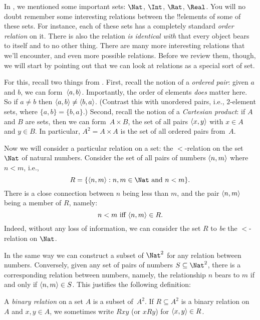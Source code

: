 \documentclass[../../../include/open-logic-section]{subfiles}
\begin{document}

\begin{explain}
In , we mentioned some important sets:
$\Nat$, $\Int$, $\Rat$, $\Real$. You will no doubt remember some
interesting relations between the !!{element}s of some of these sets.
For instance, each of these sets has a completely standard \emph{order
relation} on it.  There is also the relation \emph{is identical with}
that every object bears to itself and to no other thing. There are
many more interesting relations that we'll encounter, and even more
possible relations. Before we review them, though, we will start by
pointing out that we can look at relations as a special sort of set. 
  
For this, recall two things from . First,
recall the notion of a \emph{ordered pair}: given $a$ and $b$, we can
form~$\langle a, b \rangle$. Importantly, the order of elements \emph{does}
matter here. So if $a \neq b$ then $\langle a, b \rangle \neq \langle b, a \rangle$.
(Contrast this with unordered pairs, i.e., $2$-element sets, where
$\{a, b\}=\{b, a\}$.) Second, recall the notion of a \emph{Cartesian
product}: if $A$ and $B$ are sets, then we can form~$A \times B$, the
set of all pairs $\langle x, y \rangle$ with $x \in A$ and $y \in B$. In
particular, $A^{2}= A \times A$ is the set of all ordered pairs
from~$A$.
  
Now we will consider a particular relation on a set: the $<$-relation
on the set~$\Nat$ of natural numbers. Consider the set of all pairs of
numbers $\langle n, m \rangle$ where $n<m$, i.e.,
\[
  R=\Setabs{\tuple{n, m}}{n, m \in \Nat \text{ and } n<m}.
\]
There is a close connection between $n$ being less than $m$, and the
pair $\langle n, m \rangle$ being a member of $R$, namely:
\[
      n<m\text{ iff }\langle n, m \rangle \in R.
\]
Indeed, without any loss of information, we can consider the set $R$
to \emph{be} the $<$-relation on $\Nat$. 

In the same way we can construct a subset of $\Nat^{2}$ for any
relation between numbers. Conversely, given any set of pairs of
numbers $S \subseteq \Nat^{2}$, there is a corresponding relation
between numbers, namely, the relationship $n$ bears to $m$ if and only
if $\langle n, m \rangle \in S$. This justifies the following definition:
\end{explain}
  
\begin{defn} 
A \emph{binary relation} on a set $A$ is a subset of~$A^{2}$. If $R
\subseteq A^{2}$ is a binary relation on~$A$ and $x, y \in A$, we
sometimes write $Rxy$ (or $xRy$) for $\langle x, y \rangle \in R$.
\end{defn}
  
\end{document}
